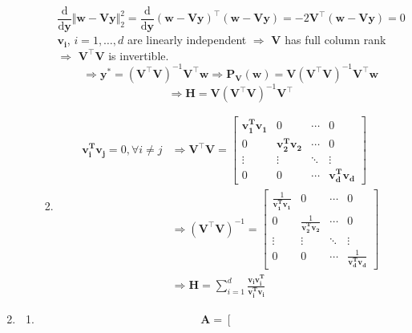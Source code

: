 \documentclass[11pt,letter,notitlepage]{article}
\newcommand{\proj}[2]{\textbf{P}_{#2} (#1)}
\begin{document}
\begin{solution}
\begin{enumerate}
\begin{enumerate}
\begin{enumerate}
\[			\]
			\[
			\frac{\mathrm{d}}{\mathrm{d} \mathbf{y}} \Vert \mathbf{w} - \mathbf{Vy} \Vert_2^2
			=
			\frac{\mathrm{d}}{\mathrm{d} \mathbf{y}} (\mathbf{w} - \mathbf{Vy})^{\top}(\mathbf{w} - \mathbf{Vy})
			=
			-2\mathbf{V}^{\top}(\mathbf{w} - \mathbf{Vy})
			=
			0
			\]
			$\mathbf{v_i}$, $i=1,\ldots,d$ are linearly independent $\Longrightarrow$ $\mathbf{V}$ has full column rank $\Longrightarrow$ $\mathbf{V}^{\top}\mathbf{V}$ is invertible.
			\[
			\Longrightarrow
			\mathbf{y}^*
			=
			(\mathbf{V}^{\top}\mathbf{V})^{-1}\mathbf{V}^{\top}\mathbf{w}
			\Longrightarrow
			\proj{\mathbf{w}}{\mathbf{V}}
			=
			\mathbf{V}(\mathbf{V}^{\top}\mathbf{V})^{-1}\mathbf{V}^{\top}\mathbf{w}
			\]
			\[
			\Longrightarrow
			\mathbf{H}
			=
			\mathbf{V}(\mathbf{V}^{\top}\mathbf{V})^{-1}\mathbf{V}^{\top}
			\]
			\item 
			\begin{align*}
			\mathbf{v_i^T}\mathbf{v_j}
			=
			0, \forall i \neq j
			&\Longrightarrow
			\mathbf{V}^{\top}\mathbf{V}
			=
			\left[\begin{matrix}
			\mathbf{v_1^T}\mathbf{v_1} & 0 & \cdots & 0\\
			0 & \mathbf{v_2^T}\mathbf{v_2} & \cdots & 0\\
			\vdots & \vdots & \ddots & \vdots\\
			0 & 0 & \cdots & \mathbf{v_d^T}\mathbf{v_d}
			\end{matrix}\right]\\
			&\Longrightarrow
			(\mathbf{V}^{\top}\mathbf{V})^{-1}
			=
			\left[\begin{matrix}
			\frac{1}{\mathbf{v_1^T}\mathbf{v_1}} & 0 & \cdots & 0\\
			0 & \frac{1}{\mathbf{v_2^T}\mathbf{v_2}} & \cdots & 0\\
			\vdots & \vdots & \ddots & \vdots\\
			0 & 0 & \cdots & \frac{1}{\mathbf{v_d^T}\mathbf{v_d}}
			\end{matrix}\right]\\
			&\Longrightarrow
			\mathbf{H}
			=
			\sum\limits_{i=1}^{d} \frac{\mathbf{v_i}\mathbf{v_i^T}}{\mathbf{v_i^T}\mathbf{v_i}}
			\end{align*}
		\end{enumerate}
	\end{enumerate}
	\item 
	\begin{enumerate}
		\item 
		\[
		\mathbf{A} = \left[
		\begin{matrix}

\end{matrix}\]
\end{enumerate}
\end{enumerate}
\end{solution}
\end{document}
